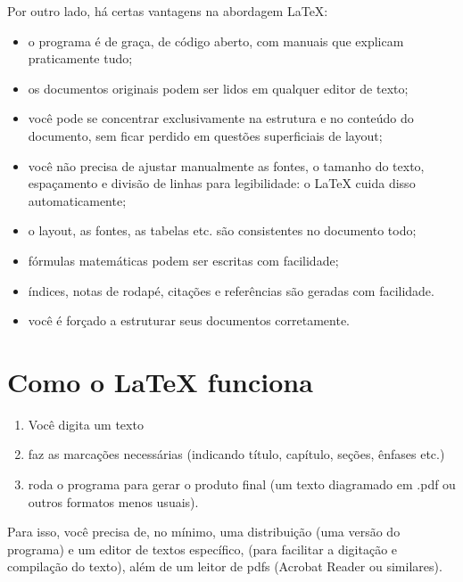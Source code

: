\documentclass[a4paper,nols,bidi,nohyper]{tufte-book}
\begin{document}
Por outro lado, há certas vantagens na abordagem \LaTeX:
\begin{itemize}
\item o programa é de graça, de código aberto, com manuais que explicam praticamente tudo;
\item os documentos originais podem ser lidos em qualquer editor de texto;
\item você pode se concentrar exclusivamente na estrutura e no conteúdo do documento, sem ficar perdido em questões superficiais de layout;
\item você não precisa de ajustar manualmente as fontes, o tamanho do texto, espaçamento e divisão de linhas para legibilidade: o \LaTeX{} cuida disso automaticamente;
\item o layout, as fontes, as tabelas etc. são consistentes no documento todo;
\item fórmulas matemáticas podem ser escritas com facilidade;
\item índices, notas de rodapé, citações e referências são geradas com facilidade.
\item você é forçado a estruturar seus documentos corretamente.
\end{itemize}



\section{Como o \LaTeX{} funciona}
 
 \begin{enumerate}
 \item  Você digita um texto \item faz as marcações necessárias (indicando título, capítulo, seções, ênfases etc.) \item  roda o programa para gerar o produto final (um texto diagramado em .pdf ou outros formatos menos usuais).
 \end{enumerate}


Para isso, você precisa de, no mínimo, uma distribuição (uma versão do programa) e um editor de textos específico,  (para facilitar a digitação e compilação do texto), além de um leitor de pdfs (Acrobat Reader ou similares).

\end{document}
